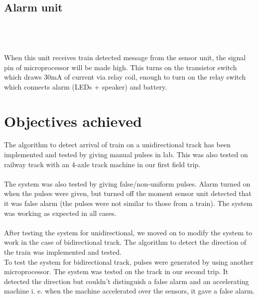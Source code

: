 \documentclass[aps,letterpaper,11pt]{article}
\begin{document}
 \subsection{Alarm unit}
\mbox{} \\ \\ \\


When this unit receives train detected message from the sensor unit, the signal pin of microprocessor will
be made high. This turns on the transistor switch which draws 30mA of current via relay coil, enough to
turn on the relay switch which connects alarm (LEDs + speaker) and battery.


\newpage

\section{Objectives achieved}
The algorithm to detect arrival of train on a unidirectional track has been implemented and tested by
giving manual pulses in lab. This was also tested on railway track with an 4-axle track machine in our
first field trip. \\ \\
The system was also tested by giving false/non-uniform pulses. Alarm turned on when the pulses were
given, but turned off the moment sensor unit detected that it was false alarm (the pulses were not similar
to those from a train). The system was working as expected in all cases. \\ \\
After testing the system for unidirectional, we moved on to modify the system to work in the case of
bidirectional track. The algorithm to detect the direction of the train was implemented and tested. \\
To test the system for bidirectional track, pulses were generated by using another microprocessor. The
system was tested on the track in our second trip. It detected the
direction but couldn't distinguish a false alarm and an accelerating machine i.
e. when the machine accelerated over the sensors, it gave a false alarm.
\\
\end{document}
